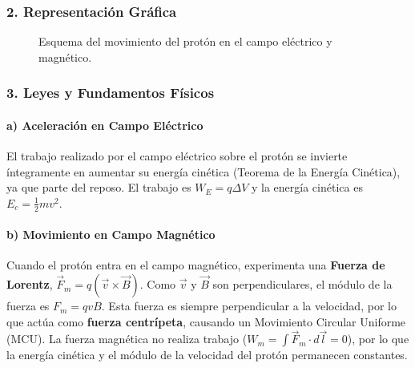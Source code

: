 \subsubsection*{2. Representación Gráfica}
\begin{figure}[H]
    \centering
    \caption{Esquema del movimiento del protón en el campo eléctrico y magnético.}
\end{figure}

\subsubsection*{3. Leyes y Fundamentos Físicos}
\paragraph*{a) Aceleración en Campo Eléctrico}
El trabajo realizado por el campo eléctrico sobre el protón se invierte íntegramente en aumentar su energía cinética (Teorema de la Energía Cinética), ya que parte del reposo. El trabajo es $W_E = q \Delta V$ y la energía cinética es $E_c = \frac{1}{2}mv^2$.
\paragraph*{b) Movimiento en Campo Magnético}
Cuando el protón entra en el campo magnético, experimenta una \textbf{Fuerza de Lorentz}, $\vec{F}_m = q(\vec{v} \times \vec{B})$. Como $\vec{v}$ y $\vec{B}$ son perpendiculares, el módulo de la fuerza es $F_m = qvB$. Esta fuerza es siempre perpendicular a la velocidad, por lo que actúa como \textbf{fuerza centrípeta}, causando un Movimiento Circular Uniforme (MCU). La fuerza magnética no realiza trabajo ($W_m = \int \vec{F}_m \cdot d\vec{l} = 0$), por lo que la energía cinética y el módulo de la velocidad del protón permanecen constantes.

